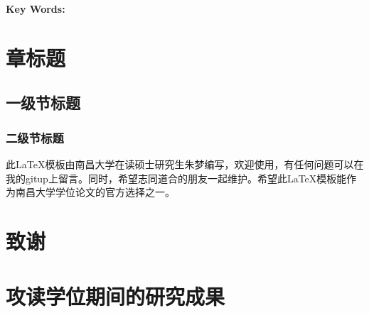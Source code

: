 \documentclass[UTF-8, a4paper, zihao=-4, no-math, openany, oneside]{ctexbook}
\begin{document}
\vspace*{1ex}\noindent \textbf{Key Words: }

\tableofcontents

\mainmatter
{}

\chapter{章标题}\label{chapter1}

\section{一级节标题}\label{sec1.1}

\subsection{二级节标题}\label{sec1.1.1}

此\LaTeX 模板由南昌大学在读硕士研究生朱梦编写，欢迎使用，有任何问题可以在我的gitup上留言。同时，希望志同道合的朋友一起维护。希望此\LaTeX 模板能作为南昌大学学位论文的官方选择之一。

\backmatter
\chapter{致谢}

\linespread{1.11111111111112}\selectfont 



\fontsize{10.5bp}{16bp}\selectfont
{}
{}

\appendix
\chapter{攻读学位期间的研究成果}

\fontsize{10.5bp}{16bp}\selectfont
\end{document}
